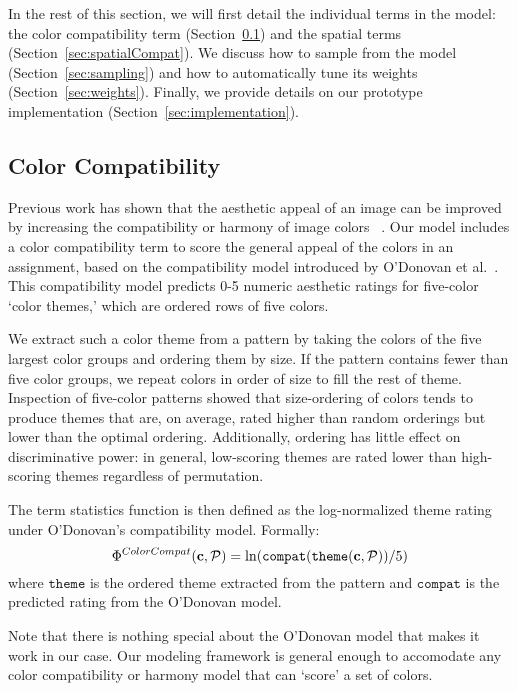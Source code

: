 In the rest of this section, we will first detail the individual terms in the model: the color compatibility term (Section~\ref{sec:colorCompat}) and the spatial terms (Section~\ref{sec:spatialCompat}). We discuss how to sample from the model (Section~\ref{sec:sampling}) and how to automatically tune its weights (Section~\ref{sec:weights}). Finally, we provide details on our prototype implementation (Section~\ref{sec:implementation}).


\subsection{Color Compatibility}
\label{sec:colorCompat}

Previous work has shown that the aesthetic appeal of an image can be improved by increasing the compatibility or harmony of image colors ~\cite{CohenOrHarmonization,DressUp,ColorizationUsingHarmony,ODonovan}. Our model includes a color compatibility term to score the general appeal of the colors in an assignment, based on the compatibility model introduced by O'Donovan et al.~. This compatibility model predicts 0-5 numeric aesthetic ratings for five-color `color themes,' which are ordered rows of five colors. 

We extract such a color theme from a pattern by taking the colors of the five largest color groups and ordering them by size. If the pattern contains fewer than five color groups, we repeat colors in order of size to fill the rest of theme. Inspection of five-color patterns showed that size-ordering of colors tends to produce themes that are, on average, rated higher than random orderings but lower than the optimal ordering. Additionally, ordering has little effect on discriminative power: in general, low-scoring themes are rated lower than high-scoring themes regardless of permutation.

The term statistics function is then defined as the log-normalized theme rating under O'Donovan's compatibility model. Formally:
\begin{equation*}
\Phi^{ColorCompat}(\mathbf{c}, \mathcal{P}) = \ln(\texttt{compat}(\texttt{theme}(\mathbf{c}, \mathcal{P}))/5)
\end{equation*}
where $\texttt{theme}$ is the ordered theme extracted from the pattern and $\texttt{compat}$ is the predicted rating from the O'Donovan model.

Note that there is nothing special about the O'Donovan model that makes it work in our case. Our modeling framework is general enough to accomodate any color compatibility or harmony model that can `score' a set of colors.

